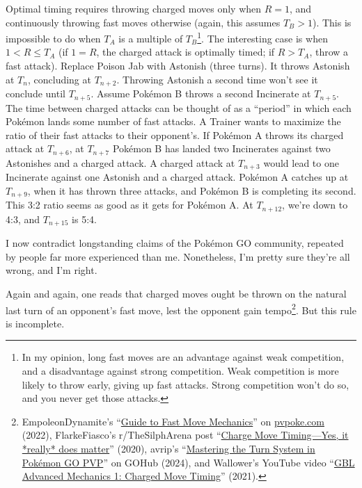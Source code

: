 Optimal timing requires throwing charged moves only when $R=1$, and continuously throwing fast moves otherwise
 (again, this assumes $T_B > 1$).
This is impossible to do when $T_A$ is a multiple of $T_B$\footnote{In my opinion, long fast moves are an advantage against weak competition, and a disadvantage
 against strong competition. Weak competition is more likely to throw early, giving up fast attacks. Strong competition
 won't do so, and you never get those attacks.}.
The interesting case is when $1 < R \le T_A$ (if $1=R$, the charged attack is optimally timed; if $R > T_A$, throw a fast attack).
Replace Poison Jab with Astonish (three turns).
It throws Astonish at $T_n$, concluding at $T_{n+2}$.
Throwing Astonish a second time won't see it conclude until $T_{n+5}$.
Assume Pokémon B throws a second Incinerate at $T_{n+5}$.
The time between charged attacks can be thought of as a ``period''
 in which each Pokémon lands some number of fast attacks.
A Trainer wants to maximize the ratio of their fast attacks to their opponent's.
If Pokémon A throws its charged attack at $T_{n+6}$, at $T_{n+7}$ Pokémon B has landed two Incinerates
  against two Astonishes and a charged attack.
A charged attack at $T_{n+3}$ would lead to one Incinerate against one Astonish
  and a charged attack.
Pokémon A catches up at $T_{n+9}$, when it has thrown three attacks, and Pokémon B is
  completing its second.
This 3:2 ratio seems as good as it gets for Pokémon A.
At $T_{n+12}$, we're down to 4:3, and $T_{n+15}$ is 5:4.

\begin{tipbox}[title=Warning! Achtung! \begin{chinese}危险！\end{chinese} ¡Peligro! \begin{japanese}危険!\end{japanese} \textit{Tulaga faigata!}]
I now contradict longstanding claims of the Pokémon GO community, repeated by
  people far more experienced than me.
Nonetheless, I'm pretty sure they're all wrong, and I'm right.
\end{tipbox}
\noindent{}Again and again, one reads that charged moves ought be thrown on the natural last turn of an
 opponent's fast move, lest the opponent gain tempo\footnote{EmpoleonDynamite's ``\href{https://pvpoke.com/articles/strategy/guide-to-fast-move-registration/}{Guide to Fast Move Mechanics}''
 on \href{https://pvpoke.com}{pvpoke.com} (2022), FlarkeFiasco's r/TheSilphArena post ``\href{reddit.com/r/TheSilphArena/comments/fvu62a/charge\_move\_timing\_yes\_it\_really\_does\_matter/}{Charge Move Timing---Yes, it *really* does matter}'' (2020),
 avrip's ``\href{https://pokemongohub.net/post/pvp/mastering-the-turn-system-in-pokemon-go-pvp/}{Mastering the Turn System in Pokémon GO PVP}'' on GOHub (2024),
 and Wallower's YouTube video ``\href{https://www.youtube.com/watch?v=pAtCo8xg700}{GBL Advanced Mechanics 1: Charged Move Timing}'' (2021).}.
But this rule is incomplete.

